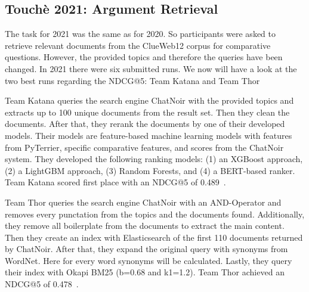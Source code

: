     \subsection{Touchè 2021: Argument Retrieval}
        The task for 2021 was the same as for 2020. So participants were asked to retrieve relevant documents from the ClueWeb12 corpus for comparative questions. However, the provided topics and therefore the queries have been changed. In 2021 there were six submitted runs. We now will have a look at the two best runs regarding the NDCG@5: Team Katana and Team Thor~\cite{BondarenkoFBGAPBSWPH2021}\par
        Team Katana queries the search engine ChatNoir with the provided topics and extracts up to 100 unique documents from the result set. Then they clean the documents. After that, they rerank the documents by one of their developed models. Their models are feature-based machine learning models with features from PyTerrier, specific comparative features, and scores from the ChatNoir system. They developed the following ranking models: (1) an XGBoost approach, (2) a LightGBM approach, (3) Random Forests, and (4) a BERT-based
        ranker. Team Katana scored first place with an NDCG@5 of 0.489~\cite{ChekalinaP2021}.\par
        Team Thor queries the search engine ChatNoir with an AND-Operator and removes every punctation from the topics and the documents found. Additionally, they remove all boilerplate from the documents to extract the main content. Then they create an index with Elasticsearch of the first 110 documents returned by ChatNoir. After that, they expand the original query with synonyms from WordNet. Here for every word synonyms will be calculated. Lastly, they query their index with Okapi BM25 (b=0.68 and k1=1.2). Team Thor achieved an NDCG@5 of 0.478~\cite{ShirshakovaW2021}. 

